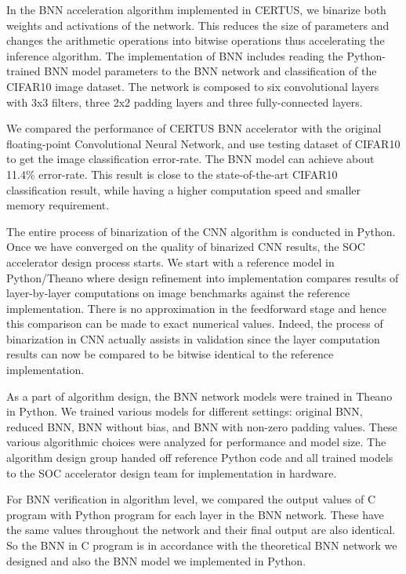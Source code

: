 In the BNN acceleration algorithm implemented in CERTUS, we binarize both
weights and activations of the network. This reduces the size of
parameters and changes the arithmetic operations into bitwise operations
thus accelerating the inference algorithm. The implementation of BNN
includes reading the Python-trained BNN model parameters to the BNN
network and classification of the CIFAR10 image dataset. The network is
composed to six convolutional layers with 3x3 filters, three 2x2 padding
layers and three fully-connected layers.

We compared the performance of CERTUS BNN accelerator with the original
floating-point Convolutional Neural Network, and use testing dataset of
CIFAR10 to get the image classification error-rate. The BNN model can
achieve about 11.4\% error-rate. This result is close to the
state-of-the-art CIFAR10 classification result, while having a higher
computation speed and smaller memory requirement.




The entire process of binarization of the CNN algorithm is conducted in
Python. Once we have converged on the quality of binarized CNN results,
the SOC accelerator design process starts. We start with a reference
model in Python/Theano where design refinement into implementation
compares results of layer-by-layer computations on image benchmarks
against the reference implementation. There is no approximation in the
feedforward stage and hence this comparison can be made to exact
numerical values. Indeed, the process of binarization in CNN actually
assists in validation since the layer computation results can now be
compared to be bitwise identical to the reference implementation.

As a part of algorithm design, the BNN network models were trained in
Theano in Python. We trained various models for different settings:
original BNN, reduced BNN, BNN without bias, and BNN with non-zero
padding values. These various algorithmic choices were analyzed for
performance and model size. The algorithm design group handed off
reference Python code and all trained models to the SOC accelerator
design team for implementation in hardware.

For BNN verification in algorithm level, we compared the output values of
C program with Python program for each layer in the BNN network. These
have the same values throughout the network and their final output are
also identical. So the BNN in C program is in accordance with the
theoretical BNN network we designed and also the BNN model we implemented
in Python.

